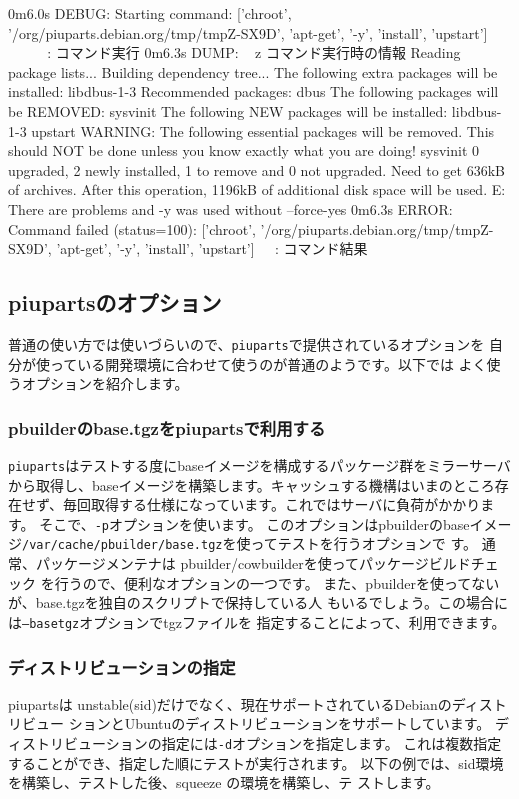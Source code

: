 \documentclass[mingoth,a4paper]{jsarticle}
\begin{document}
\begin{commandline}
0m6.0s DEBUG: Starting command: ['chroot', '/org/piuparts.debian.org/tmp/tmpZ-SX9D', 'apt-get', '-y', 'install', 'upstart']
^^^^^^^^^^^^^^^^^^^^^^^^^^^^^^: コマンド実行
0m6.3s DUMP:
^^^^^^^^^^^: コマンド実行時の情報
  Reading package lists...
  Building dependency tree...
  The following extra packages will be installed:
    libdbus-1-3
  Recommended packages:
    dbus
  The following packages will be REMOVED:
    sysvinit
  The following NEW packages will be installed:
    libdbus-1-3 upstart
  WARNING: The following essential packages will be removed.
  This should NOT be done unless you know exactly what you are doing!
    sysvinit
  0 upgraded, 2 newly installed, 1 to remove and 0 not upgraded.
  Need to get 636kB of archives.
  After this operation, 1196kB of additional disk space will be used.
  E: There are problems and -y was used without --force-yes
0m6.3s ERROR: Command failed (status=100): ['chroot', '/org/piuparts.debian.org/tmp/tmpZ-SX9D', 'apt-get', '-y', 'install', 'upstart']
^^^^^^^^^^^^: コマンド結果
\end{commandline}

\subsection{piupartsのオプション}
普通の使い方では使いづらいので、\texttt{piuparts}で提供されているオプションを
自分が使っている開発環境に合わせて使うのが普通のようです。以下では
よく使うオプションを紹介します。

\subsubsection{pbuilderのbase.tgzをpiupartsで利用する}
\texttt{piuparts}はテストする度にbaseイメージを構成するパッケージ群をミラーサーバ
から取得し、baseイメージを構築します。キャッシュする機構はいまのところ存
在せず、毎回取得する仕様になっています。これではサーバに負荷がかかります。
そこで、\texttt{-p}オプションを使います。 このオプションはpbuilderのbaseイメー
ジ\texttt{/var/cache/pbuilder/base.tgz}を使ってテストを行うオプションで
す。
通常、パッケージメンテナは pbuilder/cowbuilderを使ってパッケージビルドチェック
を行うので、便利なオプションの一つです。
また、pbuilderを使ってないが、base.tgzを独自のスクリプトで保持している人
もいるでしょう。この場合には\texttt{--basetgz}オプションでtgzファイルを
指定することによって、利用できます。

\subsubsection{ディストリビューションの指定}
piupartsは unstable(sid)だけでなく、現在サポートされているDebianのディストリビュー
ションとUbuntuのディストリビューションをサポートしています。
ディストリビューションの指定には\texttt{-d}オプションを指定します。
これは複数指定することができ、指定した順にテストが実行されます。
以下の例では、sid環境を構築し、テストした後、squeeze の環境を構築し、テ
ストします。
\end{document}
